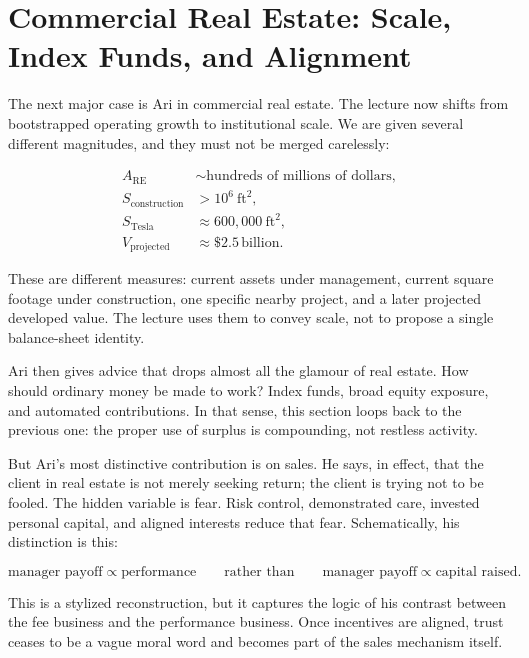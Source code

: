 \section{Commercial Real Estate: Scale, Index Funds, and Alignment}

The next major case is Ari in commercial real estate. The lecture now shifts from bootstrapped operating growth to institutional scale. We are given several different magnitudes, and they must not be merged carelessly:

\begin{align}
A_{\text{RE}} &\sim \text{hundreds of millions of dollars},\\
S_{\text{construction}} &> 10^6\ \text{ft}^2,\\
S_{\text{Tesla}} &\approx 600{,}000\ \text{ft}^2,\\
V_{\text{projected}} &\approx \$2.5\,\text{billion}.
\end{align}

These are different measures: current assets under management, current square footage under construction, one specific nearby project, and a later projected developed value. The lecture uses them to convey scale, not to propose a single balance-sheet identity.

Ari then gives advice that drops almost all the glamour of real estate. How should ordinary money be made to work? Index funds, broad equity exposure, and automated contributions. In that sense, this section loops back to the previous one: the proper use of surplus is compounding, not restless activity.

But Ari's most distinctive contribution is on sales. He says, in effect, that the client in real estate is not merely seeking return; the client is trying not to be fooled. The hidden variable is fear. Risk control, demonstrated care, invested personal capital, and aligned interests reduce that fear. Schematically, his distinction is this:

\begin{equation}
\text{manager payoff} \propto \text{performance}
\qquad \text{rather than} \qquad
\text{manager payoff} \propto \text{capital raised}.
\end{equation}

This is a stylized reconstruction, but it captures the logic of his contrast between the fee business and the performance business. Once incentives are aligned, trust ceases to be a vague moral word and becomes part of the sales mechanism itself.

